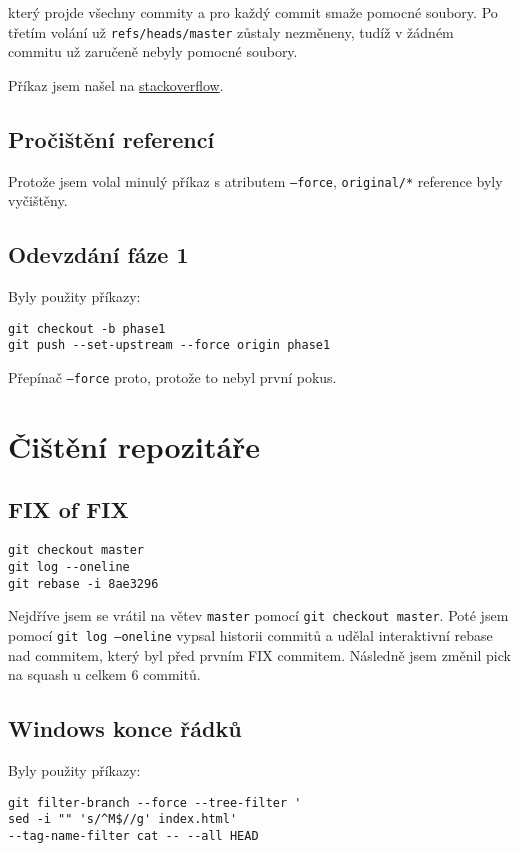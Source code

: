 \documentclass[titlepage]{article}
\begin{document}
který projde všechny commity a pro každý commit smaže pomocné soubory.
Po třetím volání už \texttt{refs/heads/master} zůstaly nezměneny, tudíž v žádném commitu už zaručeně nebyly pomocné soubory.

Příkaz jsem našel na \href{https://stackoverflow.com/questions/45732458/ignore-files-committed-to-git-and-also-remove-them-from-history}{stackoverflow}.

\subsection{Pročištění referencí}

Protože jsem volal minulý příkaz s atributem \texttt{--force}, \texttt{original/*} reference byly vyčištěny.

\subsection{Odevzdání fáze 1}
Byly použity příkazy:
\begin{verbatim}
git checkout -b phase1
git push --set-upstream --force origin phase1
\end{verbatim}

Přepínač \texttt{--force} proto, protože to nebyl první pokus.

\section{Čištění repozitáře}
\subsection{FIX of FIX}
\begin{verbatim}
git checkout master
git log --oneline
git rebase -i 8ae3296
\end{verbatim}

Nejdříve jsem se vrátil na větev \texttt{master} pomocí \texttt{git checkout master}.
Poté jsem pomocí \texttt{git log --oneline} vypsal historii commitů a udělal interaktivní rebase nad commitem, který byl před prvním FIX commitem.
Následně jsem změnil pick na squash u celkem 6 commitů.


\subsection{Windows konce řádků}
Byly použity příkazy:
\begin{verbatim}
git filter-branch --force --tree-filter '
sed -i "" 's/^M$//g' index.html'
--tag-name-filter cat -- --all HEAD
\end{verbatim}
\end{document}
